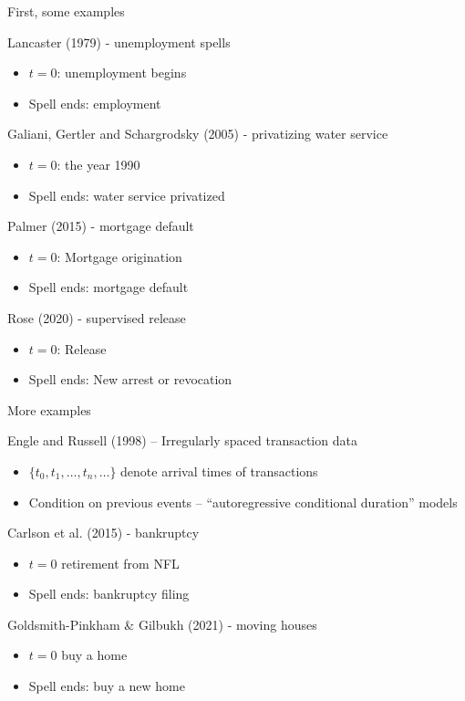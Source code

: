 \documentclass[notes,11pt, aspectratio=169]{beamer}
\newenvironment{wideitemize}{\itemize\addtolength{\itemsep}{10pt}}{\enditemize}
\begin{document}
\begin{frame}{First, some examples}
  \begin{wideitemize}
  \item Lancaster (1979) - unemployment spells
    \begin{itemize}
    \item $t=0$: unemployment begins
    \item Spell ends: employment
    \end{itemize}
  \item Galiani, Gertler and Schargrodsky (2005) - privatizing water service 
    \begin{itemize}
    \item $t=0$: the year 1990
    \item Spell ends: water service privatized      
    \end{itemize}
  \item Palmer (2015) - mortgage default
    \begin{itemize}
    \item $t = 0$: Mortgage origination
    \item Spell ends: mortgage default
    \end{itemize}
  \item Rose (2020) - supervised release
    \begin{itemize}
    \item $t = 0$: Release 
    \item Spell ends:  New arrest or revocation
    \end{itemize}
  \end{wideitemize}
\end{frame}


\begin{frame}{More examples}
  \begin{wideitemize}
  \item Engle and Russell (1998) -- Irregularly spaced transaction data
    \begin{itemize}
    \item $\{t_{0}, t_{1}, \ldots, t_{n}, \ldots \}$ denote arrival times of transactions
    \item Condition on previous events -- ``autoregressive conditional duration'' models
    \end{itemize}
  \item Carlson et al. (2015) - bankruptcy
    \begin{itemize}
    \item $t = 0$ retirement from NFL
    \item Spell ends: bankruptcy filing
    \end{itemize}
  \item Goldsmith-Pinkham \& Gilbukh (2021) - moving houses
    \begin{itemize}
    \item $t = 0$ buy a home
    \item Spell ends: buy a new home
    \end{itemize}
  \end{wideitemize}
\end{frame}
\end{document}
